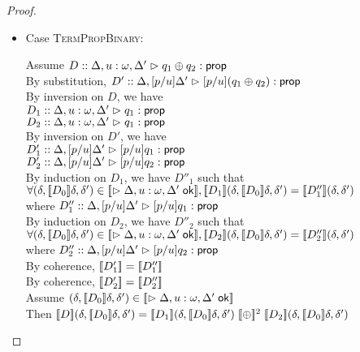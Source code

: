 \begin{proof}
\begin{enumerate}
\begin{itemize}
  \item Case \textsc{TermPropBinary}:
    \begin{tabbedproof}
      \oo Assume $D :: \judgeA[{\Delta, u:\omega, \Delta'}]{q_1 \oplus q_2}{\assert}$ \\
      \oo By substitution, $D' :: \judgeA[{\Delta, [p/u]\Delta'}]{[p/u](q_1 \oplus q_2)}{\assert}$ \\
      \ooo By inversion on $D$, we have \\
      \oooo $D_1 :: \judgeA[{\Delta, u:\omega, \Delta'}]{q_1}{\assert}$ \\
      \oooo $D_2 :: \judgeA[{\Delta, u:\omega, \Delta'}]{q_1}{\assert}$ \\
      \ooo By inversion on $D'$, we have \\
      \oooo $D'_1 :: \judgeA[{\Delta, [p/u]\Delta'}]{[p/u]q_1}{\assert}$ \\
      \oooo $D'_2 :: \judgeA[{\Delta, [p/u]\Delta'}]{[p/u]q_2}{\assert}$ \\
      \ooo By induction on $D_1$, we have $D''_1$ such that \\
      \ooox $\forall (\delta, \interp{D_0}\delta, \delta') \in \interp{\judgeACtx{\Delta, u:\omega, \Delta'}}, \interp{D_1}(\delta, \interp{D_0}\delta, \delta') = 
             \interp{D''_1}(\delta, \delta')$ \\
      \ooo where $D''_1 :: \judgeA[{\Delta, [p/u]\Delta'}]{[p/u]q_1}{\assert}$ \\
      \ooo By induction on $D_2$, we have $D''_2$ such that \\
      \ooox $\forall (\delta, \interp{D_0}\delta, \delta') \in \interp{\judgeACtx{\Delta, u:\omega, \Delta'}}, \interp{D_2}(\delta, \interp{D_0}\delta, \delta') = 
             \interp{D''_2}(\delta, \delta')$ \\
      \ooo where $D''_2 :: \judgeA[{\Delta, [p/u]\Delta'}]{[p/u]q_2}{\assert}$ \\
      \ooo By coherence, $\interp{D'_1} = \interp{D''_1}$ \\
      \ooo By coherence, $\interp{D'_2} = \interp{D''_2}$ \\
      \ooo Assume $(\delta, \interp{D_0}\delta, \delta') \in \interp{\judgeACtx{\Delta, u:\omega, \Delta'}}$ \\
      \oooo Then $\interp{D}(\delta, \interp{D_0}\delta, \delta') = 
                  \interp{D_1}(\delta, \interp{D_0}\delta, \delta') \;\interp{\oplus}^2 \;
                  \interp{D_2}(\delta, \interp{D_0}\delta, \delta')$ \\

\end{tabbedproof}
\end{itemize}
\end{enumerate}
\end{proof}
